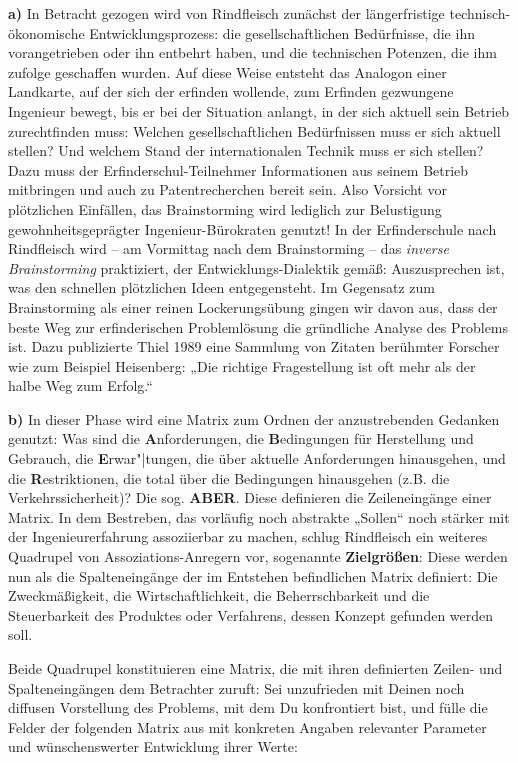 \documentclass[11pt,a4paper]{article}
\begin{document}
\textbf{a)} 
In Betracht gezogen wird von Rindfleisch zunächst der längerfristige
technisch-ökonomische Entwicklungsprozess: die gesellschaftlichen Bedürfnisse,
die ihn vorangetrieben oder ihn entbehrt haben, und die technischen Potenzen,
die ihm zufolge geschaffen wurden. Auf diese Weise entsteht das Analogon einer
Landkarte, auf der sich der erfinden wollende, zum Erfinden gezwungene
Ingenieur bewegt, bis er bei der Situation anlangt, in der sich aktuell sein
Betrieb zurechtfinden muss: Welchen gesellschaftlichen Bedürfnissen muss er
sich aktuell stellen? Und welchem Stand der internationalen Technik muss er
sich stellen? Dazu muss der Erfinderschul-Teilnehmer Informationen aus seinem
Betrieb mitbringen und auch zu Patentrecherchen bereit sein. Also Vorsicht vor
plötzlichen Einfällen, das Brainstorming wird lediglich zur Belustigung
gewohnheitsgeprägter Ingenieur-Bürokraten genutzt! In der Erfinderschule nach
Rindfleisch wird – am Vormittag nach dem Brainstorming – das \emph{inverse
  Brainstorming} praktiziert, der Entwicklungs-Dialektik gemäß: Auszusprechen
ist, was den schnellen plötzlichen Ideen entgegensteht. Im Gegensatz zum
Brainstorming als einer reinen Lockerungsübung gingen wir davon aus, dass der
beste Weg zur erfinderischen Problemlösung die gründliche Analyse des Problems
ist. Dazu publizierte Thiel 1989 eine Sammlung von Zitaten berühmter Forscher
wie zum Beispiel Heisenberg: „Die richtige Fragestellung ist oft mehr als der
halbe Weg zum Erfolg.“

\textbf{b)} 
In dieser Phase wird eine Matrix zum Ordnen der anzustrebenden Gedanken
genutzt: Was sind die \textbf{A}nforderungen, die \textbf{B}edingungen für
Herstellung und Gebrauch, die \textbf{E}rwar"|tungen, die über aktuelle
Anforderungen hinausgehen, und die \textbf{R}estriktionen, die total über die
Bedingungen hinausgehen (z.B. die Verkehrssicherheit)? Die sog. \textbf{ABER}.
Diese definieren die Zeileneingänge einer Matrix. In dem Bestreben, das
vorläufig noch abstrakte „Sollen“ noch stärker mit der Ingenieurerfahrung
assoziierbar zu machen, schlug Rindfleisch ein weiteres Quadrupel von
Assoziations-Anregern vor, sogenannte \textbf{Zielgrößen}: Diese werden nun als
die Spalteneingänge der im Entstehen befindlichen Matrix definiert: Die
Zweckmäßigkeit, die Wirtschaftlichkeit, die Beherrschbarkeit und die
Steuerbarkeit des Produktes oder Verfahrens, dessen Konzept gefunden werden
soll.

Beide Quadrupel konstituieren eine Matrix, die mit ihren definierten Zeilen-
und Spalteneingängen dem Betrachter zuruft: Sei unzufrieden mit Deinen noch
diffusen Vorstellung des Problems, mit dem Du konfrontiert bist, und fülle die
Felder der folgenden Matrix aus mit konkreten Angaben relevanter Parameter und
wünschenswerter Entwicklung ihrer Werte:
\end{document}
